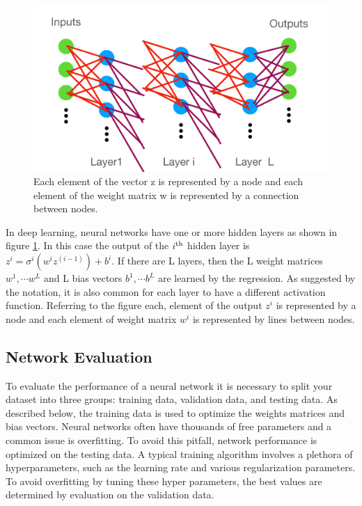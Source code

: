 \begin{refsection}
\begin{figure}[htbp]
   \centering
   \includegraphics[width=\columnwidth]{chapter_noise_sub/etc/net_fig_cartoon}
  \caption{Each element of the vector z is represented by a node and each element of the weight matrix w is represented by a connection between nodes.}
   \label{fig:net_fig_cartoon}
\end{figure}

In deep learning, neural networks have one or more hidden layers as shown in figure \ref{fig:net_fig_cartoon}. In this case the output of the $i^{\rm th}$ hidden layer is $z^{i}=\sigma^{i}(w^{i}z^{(i-1)})+b^{i}$. If there are L layers, then the L weight matrices $w^1, \cdots w^L $ and L bias vectors $b^1, \cdots b^L $ are learned by the regression. As suggested by the notation, it is also common for each layer to have a different activation function. Referring to the figure each, element of the output $z^i$ is represented by a node and each element of weight matrix $w^i$ is represented by lines between nodes.

\subsection{Network Evaluation}
To evaluate the performance of a neural network it is necessary to split your dataset into three groups: training data, validation data, and testing data.
As described below, the training data is used to optimize the weights matrices and bias vectors. Neural networks often have thousands of free parameters and a common issue is overfitting. To avoid this pitfall, network performance is optimized on the testing data. A typical training algorithm involves a plethora of hyperparameters, such as the learning rate and various regularization parameters. To avoid overfitting by tuning these hyper parameters, the best values are determined by evaluation on the validation data.

\end{refsection}
